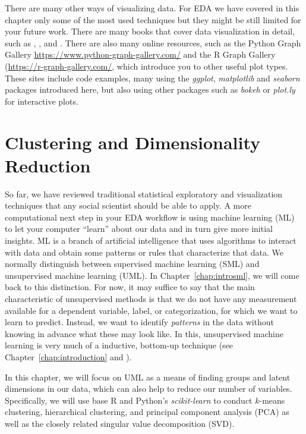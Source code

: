 There are many other ways of visualizing data. For EDA we have covered in this chapter only some of the most used techniques but they might be still limited for your future work. There are many books that cover data visualization in detail, such as \cite{tufte2006beautiful}, \cite{cairo2019charts}, and \cite{Kirk2016}.  There are also many online resources, such as the Python Graph Gallery \url{https://www.python-graph-gallery.com/} and the R Graph Gallery (\url{https://r-graph-gallery.com/}, which introduce you to other useful plot types.  These sites include code examples, many using the \emph{ggplot}, \emph{matplotlib} and \emph{seaborn} packages introduced here, but also using other packages such as \emph{bokeh} or \emph{plot.ly} for interactive plots.


%
\section{Clustering and Dimensionality Reduction}
\label{sec:clustering}

So far, we have reviewed traditional statistical exploratory and
visualization techniques that any social scientist should be able to apply. A more
computational next step in your EDA workflow is using machine learning
(ML) to let your computer ``learn'' about our data and in turn give 
more initial insights.  ML is a branch of artificial intelligence that
uses algorithms to interact with data and obtain some patterns or
rules that characterize that data. We normally distinguish between
supervised machine learning (SML) and unsupervised machine learning
(UML). In Chapter~\ref{chap:introsml}, we will come back to this distinction.
For now, it may suffice to say that the main characteristic of
unsupervised methods is that we do not have any measurement available
for a dependent variable, label, or categorization, for which we want
to learn  to predict. Instead, we want to identify
\emph{patterns} in the data without knowing in advance what these may
look like. In this, unsupervised machine learning is very much of a
inductive, bottom-up technique (see Chapter~\ref{chap:introduction} and
\cite{Boumans2016}).

In this chapter, we will focus on UML as a means of finding groups and
latent dimensions in our data, which can also help to reduce our
number of variables. Specifically, we will use base R and Python's
\emph{scikit-learn} to conduct $k$-means clustering, hierarchical
clustering, and principal component analysis (PCA) as well as the
closely related singular value decomposition (SVD).

